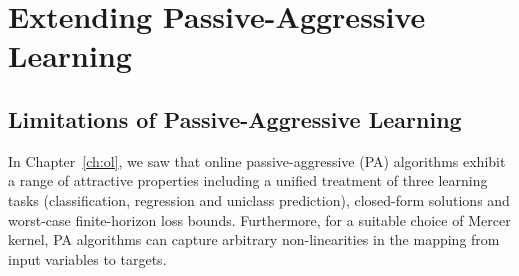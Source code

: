 \chapter{Extending Passive-Aggressive Learning}
\label{ch:pa-extensions}

\minitoc


\section{Limitations of Passive-Aggressive Learning}
\label{sec:pa-limitations}

In Chapter~\ref{ch:ol}, we saw that online passive-aggressive (PA) algorithms exhibit a range of attractive properties including a unified treatment of three learning tasks (classification, regression and uniclass prediction), closed-form solutions and worst-case finite-horizon loss bounds. Furthermore, for a suitable choice of Mercer kernel, PA algorithms can capture arbitrary non-linearities in the mapping from input variables to targets.

